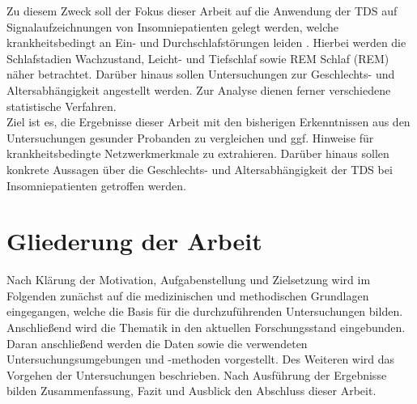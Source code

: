 \newpage

Zu diesem Zweck soll der Fokus dieser Arbeit auf die Anwendung der \acs{TDS} auf Signalaufzeichnungen von Insomniepatienten gelegt werden, welche krankheitsbedingt an Ein- und Durchschlafstörungen leiden \parencite{mayer_s3-leitlinie_2009}. Hierbei werden die Schlafstadien Wachzustand, Leicht- und Tiefschlaf sowie \acl{REM} Schlaf (\acs{REM}) näher betrachtet. Darüber hinaus sollen Untersuchungen zur Geschlechts- und Altersabhängigkeit angestellt werden. Zur Analyse dienen ferner verschiedene statistische Verfahren.\\

Ziel ist es, die Ergebnisse dieser Arbeit mit den bisherigen Erkenntnissen aus den Untersuchungen gesunder Probanden zu vergleichen und ggf. Hinweise für krankheitsbedingte Netzwerkmerkmale zu extrahieren. Darüber hinaus sollen konkrete Aussagen über die Geschlechts- und Altersabhängigkeit der \acs{TDS} bei Insomniepatienten getroffen werden. 

\section{Gliederung der Arbeit}

Nach Klärung der Motivation, Aufgabenstellung und Zielsetzung wird im Folgenden zunächst auf die medizinischen und methodischen Grundlagen eingegangen, welche die Basis für die durchzuführenden Untersuchungen bilden. Anschließend wird die Thematik in den aktuellen Forschungsstand eingebunden. Daran anschließend werden die Daten sowie die verwendeten Untersuchungsumgebungen und -methoden vorgestellt. Des Weiteren wird das Vorgehen der Untersuchungen beschrieben. Nach Ausführung der Ergebnisse bilden Zusammenfassung, Fazit und Ausblick den Abschluss dieser Arbeit. 